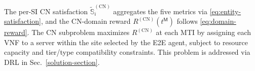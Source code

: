 \documentclass[12pt,lettersize,journal,onecolumn]{IEEEtran}
\newcounter{constraintC}
\renewcommand{\theconstraintC}{C\arabic{constraintC}-C}
\newenvironment{NamedConstraintC}{%
  \refstepcounter{constraintC}%
  \par\noindent
  \textbf{\theconstraintC:}\,    %
  \begin{math}
}{%
  \end{math}
  \par\vspace{2pt}%
}
\begin{document}
The per-SI CN satisfaction $\tilde{\mathbb{S}}^{\mathrm{(CN)}}_{i}$ aggregates the five metrics via \eqref{eq:entity-satisfaction}, and the CN-domain reward $R^{\mathrm{(CN)}}(t^\mathsf{M})$ follows \eqref{eq:domain-reward}.%
The CN subproblem maximizes $R^{\mathrm{(CN)}}$ at each MTI by assigning each VNF to a server within the site selected by the E2E agent, subject to resource capacity and tier/type compatibility constraints. This problem is addressed via DRL in Sec.~\ref{solution-section}.

\end{document}

